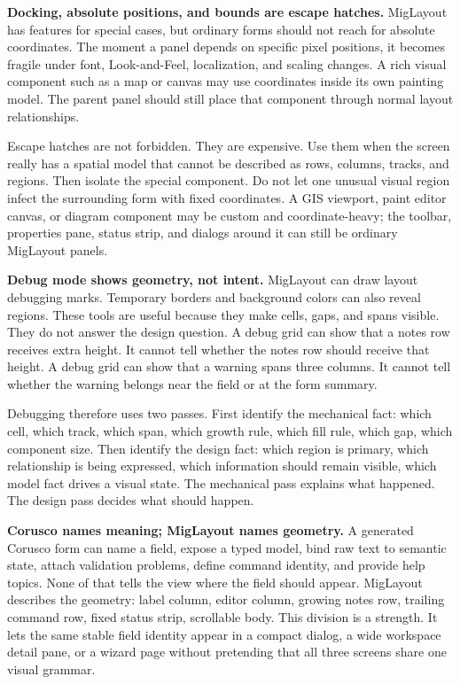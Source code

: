 \textbf{Docking, absolute positions, and bounds are escape hatches.} MigLayout
has features for special cases, but ordinary forms should not reach for
absolute coordinates. The moment a panel depends on specific pixel positions,
it becomes fragile under font, Look-and-Feel, localization, and scaling
changes. A rich visual component such as a map or canvas may use coordinates
inside its own painting model. The parent panel should still place that
component through normal layout relationships.

Escape hatches are not forbidden. They are expensive. Use them when the screen
really has a spatial model that cannot be described as rows, columns, tracks,
and regions. Then isolate the special component. Do not let one unusual visual
region infect the surrounding form with fixed coordinates. A GIS viewport,
paint editor canvas, or diagram component may be custom and coordinate-heavy;
the toolbar, properties pane, status strip, and dialogs around it can still be
ordinary MigLayout panels.

\textbf{Debug mode shows geometry, not intent.} MigLayout can draw layout
debugging marks. Temporary borders and background colors can also reveal
regions. These tools are useful because they make cells, gaps, and spans
visible. They do not answer the design question. A debug grid can show that a
notes row receives extra height. It cannot tell whether the notes row should
receive that height. A debug grid can show that a warning spans three columns.
It cannot tell whether the warning belongs near the field or at the form
summary.

Debugging therefore uses two passes. First identify the mechanical fact: which
cell, which track, which span, which growth rule, which fill rule, which gap,
which component size. Then identify the design fact: which region is primary,
which relationship is being expressed, which information should remain visible,
which model fact drives a visual state. The mechanical pass explains what
happened. The design pass decides what should happen.

\textbf{Corusco names meaning; MigLayout names geometry.} A generated Corusco
form can name a field, expose a typed model, bind raw text to semantic state,
attach validation problems, define command identity, and provide help topics.
None of that tells the view where the field should appear. MigLayout describes
the geometry: label column, editor column, growing notes row, trailing command
row, fixed status strip, scrollable body. This division is a strength. It lets
the same stable field identity appear in a compact dialog, a wide workspace
detail pane, or a wizard page without pretending that all three screens share
one visual grammar.


